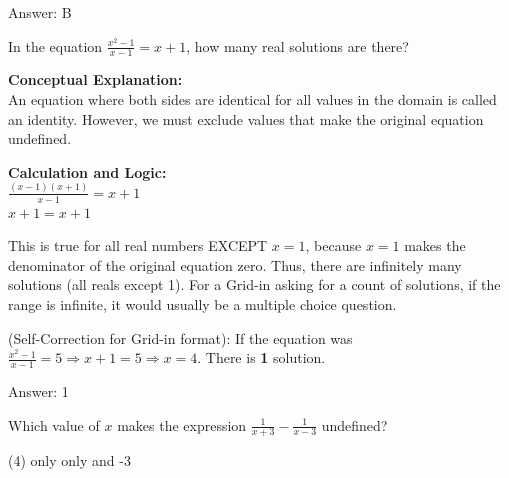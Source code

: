 \documentclass[11pt,paper=a4,answers]{exam}
\begin{document}
\begin{questions}
\begin{solution}
\vspace{25pt}

Answer: \colorbox{yellow!100}{B}
\end{solution}

\vspace{40pt}

\question
In the equation $\frac{x^2 - 1}{x - 1} = x + 1$, how many real solutions are there?

\begin{solution}
\textbf{Conceptual Explanation:} \\
An equation where both sides are identical for all values in the domain is called an identity. However, we must exclude values that make the original equation undefined.

\vspace{20pt}

\textbf{Calculation and Logic:} \\
$\frac{(x-1)(x+1)}{x-1} = x+1$ \\
$x+1 = x+1$

\vspace{10pt}

This is true for all real numbers EXCEPT $x=1$, because $x=1$ makes the denominator of the original equation zero. Thus, there are infinitely many solutions (all reals except 1). For a Grid-in asking for a count of solutions, if the range is infinite, it would usually be a multiple choice question. 

\vspace{10pt}

(Self-Correction for Grid-in format): If the equation was $\frac{x^2 - 1}{x - 1} = 5 \Rightarrow x+1=5 \Rightarrow x=4$. There is \textbf{1} solution.

\vspace{25pt}

Answer: \colorbox{yellow!100}{1}
\end{solution}

\vspace{40pt}

\question
Which value of $x$ makes the expression $\frac{1}{x+3} - \frac{1}{x-3}$ undefined?
\begin{tasks}(4)
     only
     only
     and -3
\end{tasks}


\end{questions}
\end{document}
